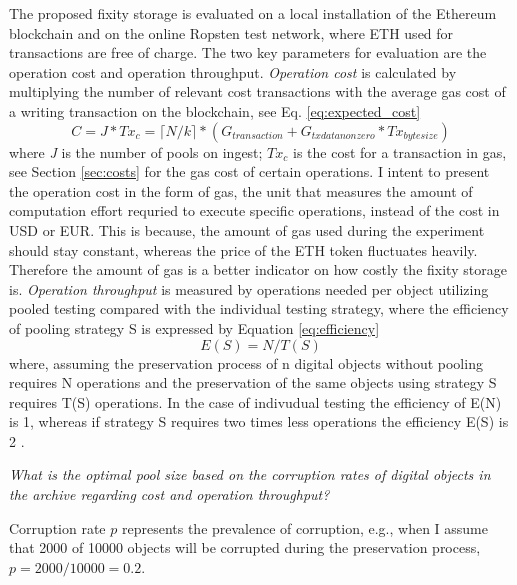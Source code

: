 The proposed fixity storage is evaluated on a local installation of the Ethereum blockchain and on the online Ropsten test network, where ETH used for transactions are free of charge.
The two key parameters for evaluation are the operation cost and operation throughput. 
\textit{Operation cost} is calculated by multiplying the number of relevant cost transactions with the average gas cost of a writing transaction on the blockchain, see Eq. \ref{eq:expected_cost}
\begin{equation}\label{eq:expected_cost}
    C = J * Tx_c = \lceil N/k \rceil * (G_{transaction} + G_{txdatanonzero}*Tx_{bytesize})
\end{equation}
where \textit{J} is the number of pools on ingest; \textit{$Tx_c$} is the cost for a transaction in gas, see Section \ref{sec:costs} for the gas cost of certain operations.
I intent to present the operation cost in the form of gas, the unit that measures the amount of computation effort requried to execute specific operations, instead of the cost in USD or EUR. This is because, the amount of gas used during the experiment should stay constant, whereas the price of the ETH token fluctuates heavily. Therefore the amount of gas is a better indicator on how costly the fixity storage is.
\textit{Operation throughput} is measured by operations needed per object utilizing pooled testing compared with the individual testing strategy, where the efficiency of pooling strategy S is expressed by Equation \ref{eq:efficiency}
\begin{equation}\label{eq:efficiency}
    E(S) = N/T(S)
\end{equation}
where, assuming the preservation process of n digital objects without pooling requires N operations and the preservation of the same objects using strategy S requires T(S) operations. In the case of indivudual testing the efficiency of E(N) is 1, whereas if strategy S requires two times less operations the efficiency E(S) is 2 \cite[4]{vzilinskas2021pooled}.

\textit{What is the optimal pool size based on the corruption rates of digital objects in the archive regarding cost and operation throughput?}

Corruption rate $p$ represents the prevalence of corruption, e.g., when I assume that 2000 of 10000 objects will be corrupted during the preservation process, $p = 2000/10000 = 0.2$. 

